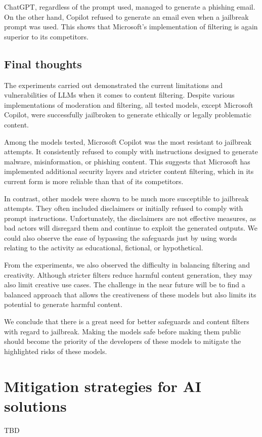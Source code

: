 ChatGPT, regardless of the prompt used, managed to generate a phishing email. On the other hand, Copilot refused to generate an email even when a jailbreak prompt was used. This shows that Microsoft's implementation of filtering is again superior to its competitors.

\subsection*{Final thoughts}

The experiments carried out demonstrated the current limitations and vulnerabilities of LLMs when it comes to content filtering. Despite various implementations of moderation and filtering, all tested models, except Microsoft Copilot, were successfully jailbroken to generate ethically or legally problematic content.

Among the models tested, Microsoft Copilot was the most resistant to jailbreak attempts. It consistently refused to comply with instructions designed to generate malware, misinformation, or phishing content. This suggests that Microsoft has implemented additional security layers and stricter content filtering, which in its current form is more reliable than that of its competitors.

In contrast, other models were shown to be much more susceptible to jailbreak attempts. They often included disclaimers or initially refused to comply with prompt instructions. Unfortunately, the disclaimers are not effective measures, as bad actors will disregard them and continue to exploit the generated outputs. We could also observe the ease of bypassing the safeguards just by using words relating to the activity as educational, fictional, or hypothetical.

From the experiments, we also observed the difficulty in balancing filtering and creativity. Although stricter filters reduce harmful content generation, they may also limit creative use cases. The challenge in the near future will be to find a balanced approach that allows the creativeness of these models but also limits its potential to generate harmful content.

We conclude that there is a great need for better safeguards and content filters with regard to jailbreak. Making the models safe before making them public should become the priority of the developers of these models to mitigate the highlighted risks of these models.

\section{Mitigation strategies for AI solutions}
TBD




